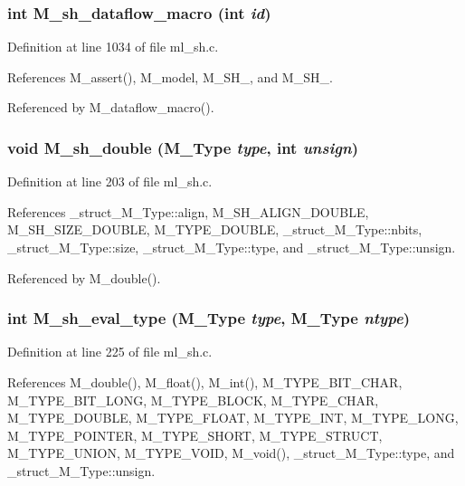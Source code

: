 \subsubsection{\setlength{\rightskip}{0pt plus 5cm}int M\_\-sh\_\-dataflow\_\-macro (int {\em id})}\label{ml__sh_8c_dac0d1a86686d0675f40ea5c845443d4}




Definition at line 1034 of file ml\_\-sh.c.

References M\_\-assert(), M\_\-model, M\_\-SH\_, and M\_\-SH\_.

Referenced by M\_\-dataflow\_\-macro().
\subsubsection{\setlength{\rightskip}{0pt plus 5cm}void M\_\-sh\_\-double (\bf{M\_\-Type} {\em type}, int {\em unsign})}\label{ml__sh_8c_7059b5e28cecb9852fc8d0798301f6f2}




Definition at line 203 of file ml\_\-sh.c.

References \_\-struct\_\-M\_\-Type::align, M\_\-SH\_\-ALIGN\_\-DOUBLE, M\_\-SH\_\-SIZE\_\-DOUBLE, M\_\-TYPE\_\-DOUBLE, \_\-struct\_\-M\_\-Type::nbits, \_\-struct\_\-M\_\-Type::size, \_\-struct\_\-M\_\-Type::type, and \_\-struct\_\-M\_\-Type::unsign.

Referenced by M\_\-double().
\subsubsection{\setlength{\rightskip}{0pt plus 5cm}int M\_\-sh\_\-eval\_\-type (\bf{M\_\-Type} {\em type}, \bf{M\_\-Type} {\em ntype})}\label{ml__sh_8c_7b4b1a2e3ff0183b6f5a8d2187bf9472}




Definition at line 225 of file ml\_\-sh.c.

References M\_\-double(), M\_\-float(), M\_\-int(), M\_\-TYPE\_\-BIT\_\-CHAR, M\_\-TYPE\_\-BIT\_\-LONG, M\_\-TYPE\_\-BLOCK, M\_\-TYPE\_\-CHAR, M\_\-TYPE\_\-DOUBLE, M\_\-TYPE\_\-FLOAT, M\_\-TYPE\_\-INT, M\_\-TYPE\_\-LONG, M\_\-TYPE\_\-POINTER, M\_\-TYPE\_\-SHORT, M\_\-TYPE\_\-STRUCT, M\_\-TYPE\_\-UNION, M\_\-TYPE\_\-VOID, M\_\-void(), \_\-struct\_\-M\_\-Type::type, and \_\-struct\_\-M\_\-Type::unsign.

